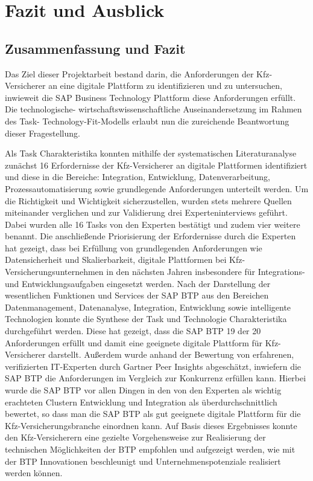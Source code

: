 \chapter{Fazit und Ausblick}

\section{Zusammenfassung und Fazit}

Das Ziel dieser Projektarbeit bestand darin, die Anforderungen der Kfz-Versicherer an eine digitale Plattform zu identifizieren und zu untersuchen, inwieweit die SAP Business Technology Plattform diese Anforderungen erfüllt. Die technologische- wirtschaftswissenschaftliche Auseinandersetzung im Rahmen des Task- Technology-Fit-Modells erlaubt nun die zureichende Beantwortung dieser Fragestellung.

Als Task Charakteristika konnten mithilfe der systematischen Literaturanalyse zunächst 16 Erfordernisse der Kfz-Versicherer an digitale Plattformen identifiziert und diese in die Bereiche: Integration, Entwicklung, Datenverarbeitung, Prozessautomatisierung sowie grundlegende Anforderungen unterteilt werden. Um die Richtigkeit und Wichtigkeit sicherzustellen, wurden stets mehrere Quellen miteinander verglichen und zur Validierung drei Experteninterviews geführt. Dabei wurden alle 16 Tasks von den Experten bestätigt und zudem vier weitere benannt. Die anschließende Priorisierung der Erfordernisse durch die Experten hat gezeigt, dass bei Erfüllung von grundlegenden Anforderungen wie Datensicherheit und Skalierbarkeit, digitale Plattformen bei Kfz-Versicherungsunternehmen in den nächsten Jahren insbesondere für Integrations- und Entwicklungsaufgaben eingesetzt werden. Nach der Darstellung der wesentlichen Funktionen und Services der SAP BTP aus den Bereichen Datenmanagement, Datenanalyse, Integration, Entwicklung sowie intelligente Technologien konnte die Synthese der Task und Technologie Charakteristika durchgeführt werden. Diese hat gezeigt, dass die SAP BTP 19 der 20 Anforderungen erfüllt und damit eine geeignete digitale Plattform für Kfz-Versicherer darstellt. Außerdem wurde anhand der Bewertung von erfahrenen, verifizierten IT-Experten durch Gartner Peer Insights abgeschätzt, inwiefern die SAP BTP die Anforderungen im Vergleich zur Konkurrenz erfüllen kann. Hierbei wurde die SAP BTP vor allen Dingen in den von den Experten als wichtig erachteten Clustern Entwicklung und Integration als  überdurchschnittlich bewertet, so dass man die SAP BTP als gut geeignete digitale Plattform für die Kfz-Versicherungsbranche einordnen kann. Auf Basis dieses Ergebnisses konnte den Kfz-Versicherern eine gezielte Vorgehensweise zur Realisierung der technischen Möglichkeiten der BTP empfohlen und aufgezeigt werden, wie mit der BTP Innovationen beschleunigt und Unternehmenspotenziale realisiert werden können.

